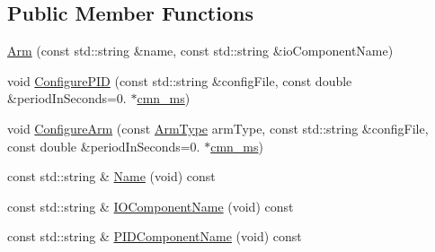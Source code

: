 \subsection*{Public Member Functions}
\begin{DoxyCompactItemize}
\item 
\hyperlink{classmts_intuitive_research_kit_console_1_1_arm_a197d262a8567790b4e1fb1ffa453b1ea}{Arm} (const std\+::string \&name, const std\+::string \&io\+Component\+Name)
\item 
void \hyperlink{classmts_intuitive_research_kit_console_1_1_arm_a46e2678902e140a5cffdfda6257b8c5e}{Configure\+P\+I\+D} (const std\+::string \&config\+File, const double \&period\+In\+Seconds=0. $\ast$\hyperlink{cmn_units_8h_aaf4d3f2fafb9b4a95606544b9d876b4a}{cmn\+\_\+ms})
\item 
void \hyperlink{classmts_intuitive_research_kit_console_1_1_arm_a7e6830efb231e90cbbae68d294ba1a16}{Configure\+Arm} (const \hyperlink{classmts_intuitive_research_kit_console_1_1_arm_acb898ba65d323f59ffd0885a47ef6cec}{Arm\+Type} arm\+Type, const std\+::string \&config\+File, const double \&period\+In\+Seconds=0. $\ast$\hyperlink{cmn_units_8h_aaf4d3f2fafb9b4a95606544b9d876b4a}{cmn\+\_\+ms})
\item 
const std\+::string \& \hyperlink{classmts_intuitive_research_kit_console_1_1_arm_a23ae87d2f48b0d547537e9e1b38b4df6}{Name} (void) const 
\item 
const std\+::string \& \hyperlink{classmts_intuitive_research_kit_console_1_1_arm_ab148bb76eba17d89fabec9b472495e08}{I\+O\+Component\+Name} (void) const 
\item 
const std\+::string \& \hyperlink{classmts_intuitive_research_kit_console_1_1_arm_a2621f6e1b41173a0d76fcfeb0387f98c}{P\+I\+D\+Component\+Name} (void) const 
\end{DoxyCompactItemize}
